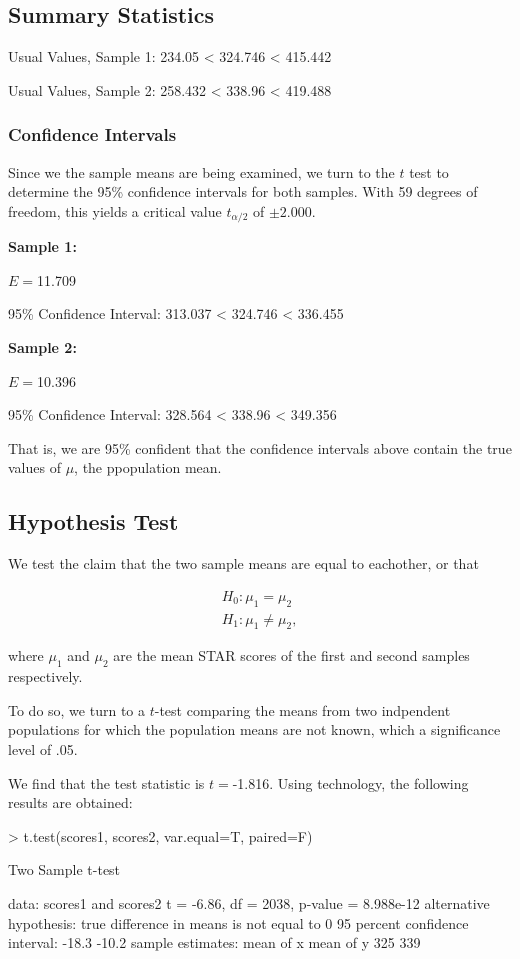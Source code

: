 \documentclass[twocolumn,english]{IEEEtran}
\theoremstyle{plain}
\theoremstyle{plain}
\begin{document}
\hrulefill

\subsection{Summary Statistics}
Usual Values, Sample 1:
234.05 < 324.746 < 415.442


Usual Values, Sample 2:
258.432 < 338.96 < 419.488


\subsubsection{Confidence Intervals}

Since we the sample means are being examined, we turn to the $t$ test to determine the 95\% confidence intervals for both samples. With 59 degrees of freedom, this yields a critical value $t_{\alpha/2}$ of $\pm 2.000$. 


\textbf{Sample 1:}

$E =$11.709

95\% Confidence Interval: 313.037 < 324.746 < 336.455


\textbf{Sample 2:}

$E =$10.396

95\% Confidence Interval: 328.564 < 338.96 < 349.356

That is, we are 95\% confident that the confidence intervals above contain the true values of $\mu$, the ppopulation mean.

\hrulefill

\subsection{Hypothesis Test}

We test the claim that the two sample means are equal to eachother, or that

\begin{align*}
		H_0: \mu_1 = \mu_2 \\
		H_1: \mu_1 \neq \mu_2,
\end{align*}

where $\mu_1$ and $\mu_2$ are the mean STAR scores of the first and second samples respectively.

To do so, we turn to a $t$-test comparing the means from two indpendent populations for which the population means are not known, which a significance level of .05.

We find that the test statistic is $t =$-1.816. Using technology, the following results are obtained:
\begin{Schunk}
\begin{Sinput}
> t.test(scores1, scores2, var.equal=T, paired=F)
\end{Sinput}
\begin{Soutput}
	Two Sample t-test

data:  scores1 and scores2
t = -6.86, df = 2038, p-value = 8.988e-12
alternative hypothesis: true difference in means is not equal to 0
95 percent confidence interval:
 -18.3 -10.2
sample estimates:
mean of x mean of y 
      325       339 
\end{Soutput}
\end{Schunk}
\end{document}
